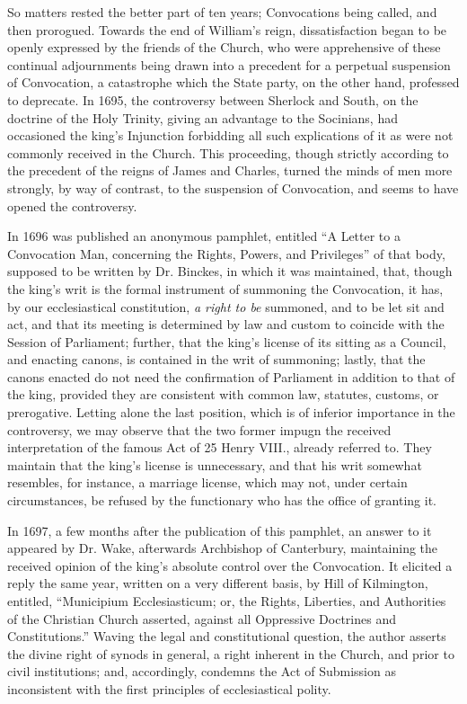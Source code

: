 So matters rested the better
part of ten years; Convocations being called, and then prorogued.
Towards the end of William's reign, dissatisfaction began to be openly
expressed by the friends of the Church, who were apprehensive of these
continual adjournments being drawn into a precedent for a perpetual
suspension of Convocation, a catastrophe which the State party, on the
other hand, professed to deprecate. In 1695, the controversy between
Sherlock and South, on the doctrine of the Holy Trinity, giving an
advantage to the Socinians, had occasioned the king's Injunction
forbidding all such explications of it as were not commonly received
in the Church. This proceeding, though strictly according to the
precedent of the reigns of James and Charles, turned the minds of men
more strongly, by way of contrast, to the suspension of Convocation,
and seems to have opened the controversy.

In 1696 was published an
anonymous pamphlet, entitled ``A Letter to a Convocation Man,
concerning the Rights, Powers, and Privileges'' of that body, supposed
to be written by Dr. Binckes, in which it was maintained, that, though
the king's writ is the formal instrument of summoning the Convocation,
it has, by our ecclesiastical constitution, \emph{a right to be}
summoned, and to be let sit and act, and that its meeting is
determined by law and custom to coincide with the Session of
Parliament; further, that the king's license of its sitting as a
Council, and enacting canons, is contained in the writ of summoning;
lastly, that the canons enacted do not need the confirmation of
Parliament in addition to that of the king, provided they are
consistent with common law, statutes, customs, or prerogative. Letting
alone the last position, which is of inferior importance in the
controversy, we may observe that the two former impugn the received
interpretation of the famous Act of 25 Henry VIII., already referred
to. They maintain that the king's license is unnecessary, and that his
writ somewhat resembles, for instance, a marriage license, which may
not, under certain circumstances, be refused by the functionary who
has the office of granting it.

In 1697, a few months after
the publication of this pamphlet, an answer to it appeared by Dr.
Wake, afterwards Archbishop of Canterbury, maintaining the received
opinion of the king's absolute control over the Convocation. It
elicited a reply the same year, written on a very different basis, by
Hill of Kilmington, entitled, ``Municipium Ecclesiasticum; or, the
Rights, Liberties, and Authorities of the Christian Church asserted,
against all Oppressive Doctrines and Constitutions.'' Waving the legal
and constitutional question, the author asserts the divine right of
synods in general, a right inherent in the Church, and prior to civil
institutions; and, accordingly, condemns the Act of Submission as
inconsistent with the first principles of ecclesiastical polity.

